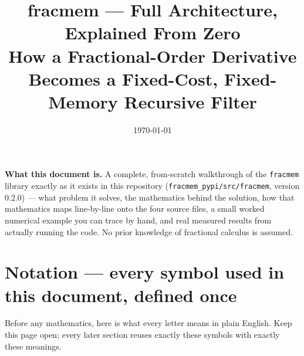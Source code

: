 \documentclass[11pt]{article}
\title{\textbf{fracmem} --- Full Architecture, Explained From Zero\\[0.4em]
\large How a Fractional-Order Derivative Becomes a Fixed-Cost, Fixed-Memory Recursive Filter}
\author{}
\date{\today}
\begin{document}
\maketitle

\begin{cbox}
\textbf{What this document is.} A complete, from-scratch walkthrough of the \texttt{fracmem} library exactly as it exists in this repository (\texttt{fracmem\_pypi/src/fracmem}, version 0.2.0) --- what problem it solves, the mathematics behind the solution, how that mathematics maps line-by-line onto the four source files, a small worked numerical example you can trace by hand, and real measured results from actually running the code. No prior knowledge of fractional calculus is assumed.
\end{cbox}

\tableofcontents

\section{Notation --- every symbol used in this document, defined once}

Before any mathematics, here is what every letter means in plain English. Keep this page open; every later section reuses exactly these symbols with exactly these meanings.
\end{document}
